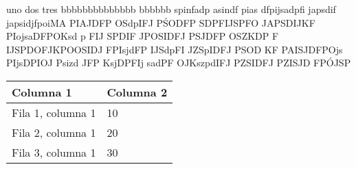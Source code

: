 \documentclass{article}
\begin{document}
\begin{multicols}{2}
  uno dos tres bbbbbbbbbbbbbb bbbbbb spinfadp asindf pias dfpijsadpfi japsdif
  japsidjfpoiMA PIAJDFP OSdpIFJ PŚODFP SDPFIJSPFO JAPSDIJKF PIojsaDFPOKsd p FIJ
  SPDIF JPOSIDFJ PSJDFP OSZKDP F IJSPDOFJKPOOSIDJ FPIsjdFP IJSdpFI JZSpIDFJ
  PSOD
  KF PAISJDFPOjs PIjsDPIOJ Psizd JFP KsjDPFIj sadPF OJKszpdIFJ PZSIDFJ PZISJD
  FPÓJSP

\end{multicols}

\begin{table}[ht]
  \begin{tabular}{|p{4cm}|m{4cm}|}
    \toprule
    \textbf{Columna 1} & \textbf{Columna 2} \\
    \midrule
    Fila 1, columna 1  & 10                 \\
    Fila 2, columna 1  & 20                 \\
    Fila 3, columna 1  & 30                 \\
    \bottomrule
  \end{tabular}
\end{table}
\end{document}
